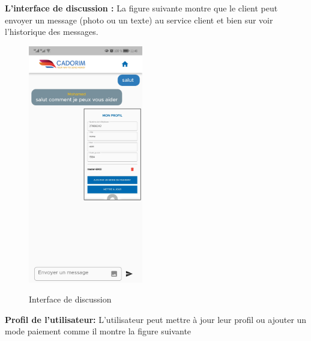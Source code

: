 	\item \textbf{L’interface de discussion
		:} La figure suivante montre que le client peut envoyer un message (photo ou un texte) au service client et bien sur voir l'historique des messages.
	\begin{figure}%
		\centering
		{{\includegraphics[width=5cm]{./Template LaTeX/Images/c.jpg} }}%
		\caption{Interface de discussion}%
		\label{fig:example}%
	\end{figure}
	\newpage
	\item \textbf{Profil de l'utilisateur:} L'utilisateur peut mettre à jour leur profil ou ajouter un mode paiement comme il montre la figure suivante
